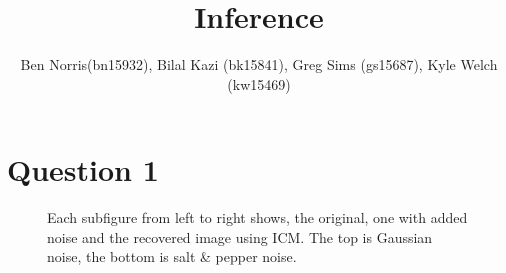 \documentclass[]{article}
\begin{document}
    
        \title{Inference}
        \author{Ben Norris(bn15932), Bilal Kazi (bk15841), Greg Sims (gs15687), Kyle Welch (kw15469)}
        \maketitle

    \section*{Question 1}
        \begin{figure}[h]
            \centering
            \caption{Each subfigure from left to right shows, the original, one with added noise and the recovered image using ICM. The top is Gaussian noise, the bottom is salt \& pepper noise.}
            \label{fig:q1}
        \end{figure}
\end{document}
